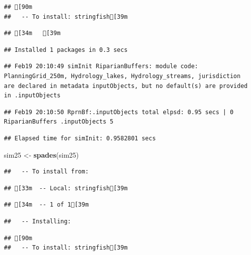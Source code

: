\documentclass[
]{article}
\newenvironment{Shaded}{\begin{snugshade}}{\end{snugshade}}
\newcommand{\FunctionTok}[1]{\textcolor[rgb]{0.13,0.29,0.53}{\textbf{#1}}}
\newcommand{\NormalTok}[1]{#1}
\newcommand{\OtherTok}[1]{\textcolor[rgb]{0.56,0.35,0.01}{#1}}
\begin{document}
\begin{verbatim}
## [90m
##   -- To install: stringfish[39m
\end{verbatim}

\begin{verbatim}
## [34m   [39m
\end{verbatim}

\begin{verbatim}
## Installed 1 packages in 0.3 secs
\end{verbatim}

\begin{verbatim}
## Feb19 20:10:49 simInit RiparianBuffers: module code: PlanningGrid_250m, Hydrology_lakes, Hydrology_streams, jurisdiction are declared in metadata inputObjects, but no default(s) are provided in .inputObjects
\end{verbatim}

\begin{verbatim}
## Feb19 20:10:50 RprnBf:.inputObjects total elpsd: 0.95 secs | 0 RiparianBuffers .inputObjects 5
\end{verbatim}

\begin{verbatim}
## Elapsed time for simInit: 0.9582801 secs
\end{verbatim}

\begin{Shaded}
\begin{Highlighting}[]
\NormalTok{sim25 }\OtherTok{\textless{}{-}} \FunctionTok{spades}\NormalTok{(sim25)}
\end{Highlighting}
\end{Shaded}

\begin{verbatim}
##   -- To install from:
\end{verbatim}

\begin{verbatim}
## [33m  -- Local: stringfish[39m
\end{verbatim}

\begin{verbatim}
## [34m  -- 1 of 1[39m
\end{verbatim}

\begin{verbatim}
##   -- Installing:
\end{verbatim}

\begin{verbatim}
## [90m
##   -- To install: stringfish[39m
\end{verbatim}
\end{document}
